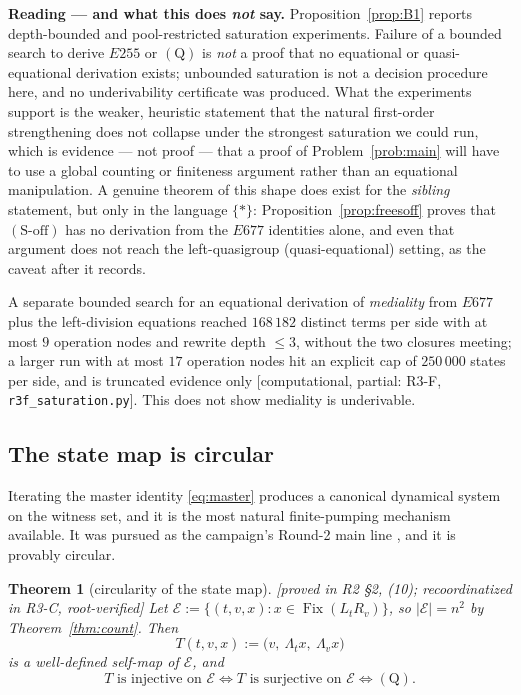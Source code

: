 \documentclass[11pt]{article}
\theoremstyle{plain}
\newtheorem{theorem}{Theorem}[section]
\theoremstyle{definition}
\theoremstyle{remark}
\numberwithin{equation}{section}
\newcommand{\op}{\mathbin{*}}
\newcommand{\Fix}{\operatorname{Fix}}
\newcommand{\statusbox}[1]{{\small\sloppy\textsf{[#1]}}}
\newcommand{\PROVED}[1]{\statusbox{proved in #1, root-verified}}
\newcommand{\PARTIAL}[1]{\statusbox{computational, partial: #1}}
\begin{document}
\textbf{Reading --- and what this does \emph{not} say.} Proposition~\ref{prop:B1} reports
depth-bounded and pool-restricted saturation experiments. Failure of a bounded search to
derive $E255$ or $(\mathrm{Q})$ is \emph{not} a proof that no equational or quasi-equational
derivation exists; unbounded saturation is not a decision procedure here, and no
underivability certificate was produced. What the experiments support is the weaker,
heuristic statement that the natural first-order strengthening does not collapse under the
strongest saturation we could run, which is evidence --- not proof --- that a proof of
Problem~\ref{prob:main} will have to use a global counting or finiteness argument rather than
an equational manipulation. A genuine theorem of this shape does exist for the
\emph{sibling} statement, but only in the language $\{\op\}$: Proposition~\ref{prop:freesoff}
proves that $(\mathrm{S\text{-}off})$ has no derivation from the $E677$ identities alone, and
even that argument does not reach the left-quasigroup (quasi-equational) setting, as the
caveat after it records.

A separate bounded search for an equational derivation of \emph{mediality} from $E677$ plus
the left-division equations reached $168\,182$ distinct terms per side with at most $9$
operation nodes and rewrite depth $\le 3$, without the two closures meeting; a larger run with
at most $17$ operation nodes hit an explicit cap of $250\,000$ states per side, and is
truncated evidence only \PARTIAL{R3-F, \texttt{r3f\_saturation.py}}. This does not show
mediality is underivable.

\subsection{The state map is circular}\label{sec:blockstate}

Iterating the master identity \eqref{eq:master} produces a canonical dynamical system on the
witness set, and it is the most natural finite-pumping mechanism available. It was pursued as
the campaign's Round-2 main line \cite{R2}, and it is provably circular.

\begin{theorem}[circularity of the state map]\label{thm:B2}
\PROVED{R2 \S2, (10); recoordinatized in R3-C}
Let $\mathcal E := \{(t,v,x) : x\in\Fix(L_tR_v)\}$, so $|\mathcal E| = n^2$ by
Theorem~\ref{thm:count}. Then
\[
  T(t,v,x) := \bigl(v,\ \Lambda_t x,\ \Lambda_v x\bigr)
\]
is a well-defined self-map of $\mathcal E$, and
\[
  T \text{ is injective on } \mathcal E
  \iff T \text{ is surjective on } \mathcal E
  \iff (\mathrm{Q}) .
\]
\end{theorem}
\end{document}
